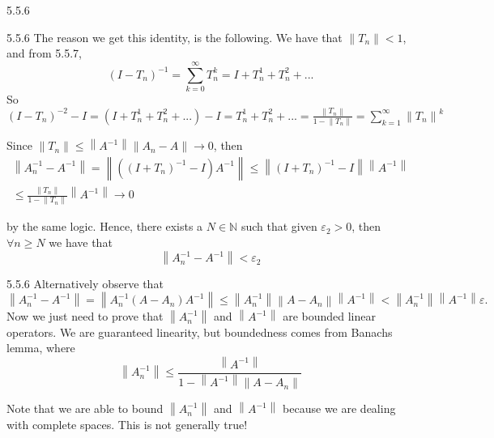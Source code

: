 \documentclass[a4paper,norsk]{article}
\renewcommand{\geq}{\geqslant}
\renewcommand{\leq}{\leqslant}
\renewcommand{\epsilon}{\varepsilon}
\begin{document}
\begin{oppgavebox}{5.5.6}{}
\begin{proofbox}{5.5.6}{}
    The reason we get this identity, is the following. We have that $ \left\lVert T_n \right\rVert < 1 $, and from 5.5.7,
    \[
        \left( I - T_n \right) ^{-1} = \sum_{k=0}^{\infty} T_n^k = I + T_n ^{1}   +   T_n ^{2} + ... 
    \]
    So $ \left( I - T_n \right) ^{-2} - I = \left( I + T_n ^{1} + T_n ^{2} + ...   \right) - I = T_n ^{1} + T_n ^{2} + ... = \frac{ \left\lVert T_n \right\rVert  }{ 1 - \left\lVert T_n \right\rVert  }  = \sum_{k=1}^{\infty} \left\lVert T_n \right\rVert ^{k}     $ 
    
    

    Since $ \left\lVert T_n \right\rVert \leq \left\lVert A ^{-1}  \right\rVert \left\lVert A_n - A \right\rVert \to 0    $, then 
    \begin{align*}
        \left\lVert A_n ^{-1} - A ^{-1}   \right\rVert = \left\lVert \left( \left( I + T_n \right) ^{-1} - I  \right) A ^{-1}   \right\rVert \leq  \left\lVert \left( I + T_n \right) ^{-1} - I  \right\rVert \left\lVert A ^{-1}  \right\rVert  \\
        \leq \frac{ \left\lVert T_n \right\rVert  }{ 1 - \left\lVert T_n \right\rVert  } \left\lVert A ^{-1}  \right\rVert \to 0
    \end{align*}
     
    by the same logic. Hence, there exists a $ N \in \mathbb{N} $  such that given $ \epsilon _ 2 > 0 $, then $ \forall n \geq N $ we have that
    \[
        \left\lVert A_n ^{-1} - A ^{-1}   \right\rVert < \epsilon _2
    \]
\end{proofbox}

\begin{proofbox}{5.5.6}{}
    Alternatively observe that 
    \[
        \left\lVert A_n ^{-1} - A ^{-1}   \right\rVert = \left\lVert A_n ^{-1} \left( A - A_n \right) A ^{-1}   \right\rVert \leq \left\lVert A_n ^{-1}  \right\rVert \left\lVert A - A_n \right\rVert \left\lVert A ^{-1}  \right\rVert < \left\lVert A_n ^{-1}  \right\rVert \left\lVert A ^{-1}  \right\rVert \epsilon.
    \]
    Now we just need to prove that $ \left\lVert A_n ^{-1}  \right\rVert  $ and $ \left\lVert A ^{-1}  \right\rVert  $ are bounded linear operators. We are guaranteed linearity, but boundedness comes from Banachs lemma, where
    \[
        \left\lVert A_n ^{-1}  \right\rVert \leq \frac{ \left\lVert A ^{-1}  \right\rVert  }{ 1 - \left\lVert A ^{-1}  \right\rVert \left\lVert A - A_n \right\rVert   }
    \]

    Note that we are able to bound $ \left\lVert A_n ^{-1}  \right\rVert  $ and $ \left\lVert A ^{-1}  \right\rVert  $ because we are dealing with complete spaces. This is not generally true!
    
\end{proofbox}
\end{oppgavebox}
\end{document}
